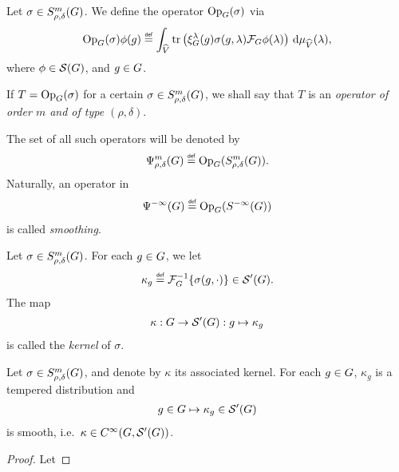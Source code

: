 \begin{definition}
\label{definition:operator_classes}
    Let $\sigma \in S^{m}_{\rho, \delta}(G)$.
    We define the operator $\mathrm{Op}_{G}(\sigma)$ via
    \begin{align*}
        \Op(\sigma) \phi(g) \defeq
        \int_\dualGroup\VectorSpace
            \tr\left(\Rep\lambda(g) \sigma(g, \lambda) \Fourier \phi(\lambda)\right)
        \dd \Plancherel{\VectorSpace}(\lambda),
    \end{align*}
    where $\phi \in {\mathcal{S} (G)}$, and $g \in G$.


    If $T = \mathrm{Op}_{G}(\sigma)$ for a certain $\sigma \in S^{m}_{\rho, \delta}(G)$,
    we shall say that $T$ is an \emph{operator of order $m$ and of type $(\rho, \delta)$}.

    The set of all such operators will be denoted by
    \begin{align*}
        \OperatorClass{m}{\rho, \delta} \defeq \Op(\SymbolClass{m}{\rho, \delta}).
    \end{align*}
    Naturally, an operator in
    \begin{align*}
        \SmoothingOperators \defeq \Op(\SmoothingSymbols)
    \end{align*}
    is called \emph{smoothing}.
\end{definition}

\begin{definition}
\label{definition:kernel_of_symbol}
    Let $\sigma \in S^{m}_{\rho, \delta}(G)$.
    For each $g \in G$, we let
    \begin{align*}
        \kappa_g \defeq \InverseFourier\{\sigma(g, \dummy)\} \in \TemperedDistributions\Group.
    \end{align*}
    The map
    \begin{align*}
        \kappa : G \to {\mathcal{S}' (G)} : g \mapsto \kappa_g
    \end{align*}
    is called the \emph{kernel} of $\sigma$.
\end{definition}

\begin{lemma}
    Let $\sigma \in S^{m}_{\rho, \delta}(G)$,
    and denote by $\kappa$ its associated kernel.
    For each $g \in G$,
    $\kappa_g$ is a tempered distribution and
    \begin{align*}
        g \in G \mapsto \kappa_g \in {\mathcal{S}' (G)}
    \end{align*}
    is smooth,
    i.e.\ $\kappa \in {C^\infty(G, {\mathcal{S}' (G)})}$.
\end{lemma}
\begin{proof}
    Let
\end{proof}

